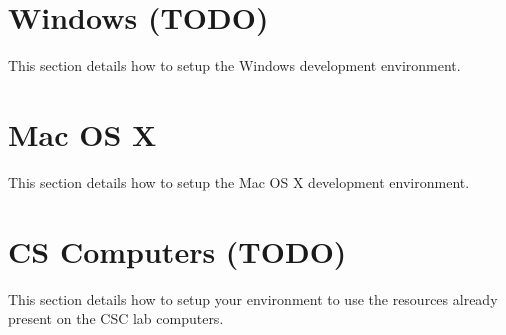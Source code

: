 \documentclass{article}
\begin{document}
\section{Windows (TODO)}
This section details how to setup the Windows development environment.


\section{Mac OS X}
This section details how to setup the Mac OS X development environment.


\section{CS Computers (TODO)}
This section details how to setup your environment to use the resources already present on the CSC
lab computers.

\end{document}
